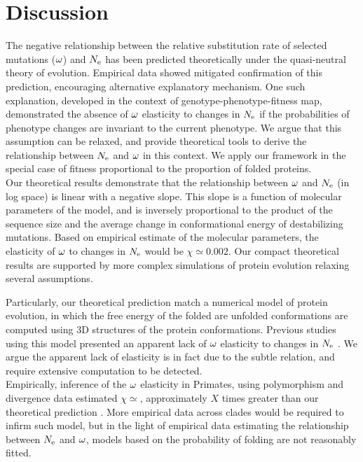 \documentclass{article}
\begin{document}
\section*{Discussion}
The negative relationship between the relative substitution rate of selected mutations ($\omega$) and $N_{\mathrm{e}}$ has been predicted theoretically under the quasi-neutral theory of evolution.
Empirical data showed mitigated confirmation of this prediction, encouraging alternative explanatory mechanism.
One such explanation, developed in the context of genotype-phenotype-fitness map, demonstrated the absence of $\omega$ elasticity to changes in $N_{\mathrm{e}}$ if the probabilities of phenotype changes are invariant to the current phenotype.
We argue that this assumption can be relaxed, and provide theoretical tools to derive the relationship between $N_{\mathrm{e}}$ and $\omega$ in this context.
We apply our framework in the special case of fitness proportional to the proportion of folded proteins. \\

Our theoretical results demonstrate that the relationship between $\omega$ and $N_{\mathrm{e}}$ (in log space) is linear with a negative slope.
This slope is a function of molecular parameters of the model, and is inversely proportional to the product of the sequence size and the average change in conformational energy of destabilizing mutations. 
Based on empirical estimate of the molecular parameters, the elasticity of $\omega$ to changes in $N_{\mathrm{e}}$ would be $\chi \simeq 0.002$.
Our compact theoretical results are supported by more complex simulations of protein evolution relaxing several assumptions.

Particularly, our theoretical prediction match a numerical model of protein evolution, in which the free energy of the folded are unfolded conformations are computed using $3$D structures of the protein conformations.
Previous studies using this model presented an apparent lack of $\omega$ elasticity to changes in $N_{\mathrm{e}}$ \cite{Goldstein2013}.
We argue the apparent lack of elasticity is in fact due to the subtle relation, and require extensive computation to be detected.\\

Empirically, inference of the $\omega$ elasticity in Primates, using polymorphism and divergence data estimated $\chi \simeq $, approximately $X$ times greater than our theoretical prediction \cite{Brevet2019}.
More empirical data across clades would be required to infirm such model, but in the light of empirical data estimating the relationship between $N_{\mathrm{e}}$ and $\omega$, models based on the probability of folding are not reasonably fitted.\\
\end{document}
